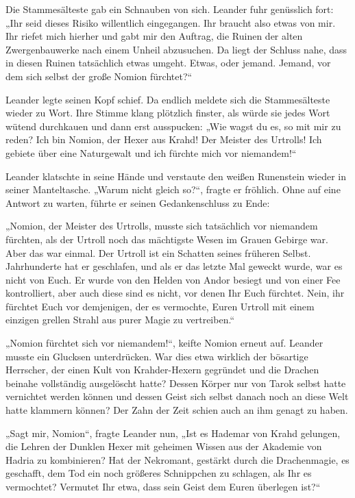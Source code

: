 Die Stammesälteste gab ein Schnauben von sich. Leander fuhr genüsslich fort: „Ihr seid dieses Risiko willentlich eingegangen. Ihr braucht also etwas von mir. Ihr riefet mich hierher und gabt mir den Auftrag, die Ruinen der alten Zwergenbauwerke nach einem Unheil abzusuchen. Da liegt der Schluss nahe, dass in diesen Ruinen tatsächlich etwas umgeht. Etwas, oder jemand. Jemand, vor dem sich selbst der große Nomion fürchtet?“

Leander legte seinen Kopf schief. Da endlich meldete sich die Stammesälteste wieder zu Wort. Ihre Stimme klang plötzlich finster, als würde sie jedes Wort wütend durchkauen und dann erst ausspucken: „Wie wagst du es, so mit mir zu reden? Ich bin Nomion, der Hexer aus Krahd! Der Meister des Urtrolls! Ich gebiete über eine Naturgewalt und ich fürchte mich vor niemandem!“

Leander klatschte in seine Hände und verstaute den weißen Runenstein wieder in seiner Manteltasche. „Warum nicht gleich so?“, fragte er fröhlich. Ohne auf eine Antwort zu warten, führte er seinen Gedankenschluss zu Ende:

„Nomion, der Meister des Urtrolls, musste sich tatsächlich vor niemandem fürchten, als der Urtroll noch das mächtigste Wesen im Grauen Gebirge war. Aber das war einmal. Der Urtroll ist ein Schatten seines früheren Selbst. Jahrhunderte hat er geschlafen, und als er das letzte Mal geweckt wurde, war es nicht von Euch. Er wurde von den Helden von Andor besiegt und von einer Fee kontrolliert, aber auch diese sind es nicht, vor denen Ihr Euch fürchtet. Nein, ihr fürchtet Euch vor demjenigen, der es vermochte, Euren Urtroll mit einem einzigen grellen Strahl aus purer Magie zu vertreiben.“

„Nomion fürchtet sich vor niemandem!“, keifte Nomion erneut auf. Leander musste ein Glucksen unterdrücken. War dies etwa wirklich der bösartige Herrscher, der einen Kult von Krahder-Hexern gegründet und die Drachen beinahe vollständig ausgelöscht hatte? Dessen Körper nur von Tarok selbst hatte vernichtet werden können und dessen Geist sich selbst danach noch an diese Welt hatte klammern können? Der Zahn der Zeit schien auch an ihm genagt zu haben.

„Sagt mir, Nomion“, fragte Leander nun, „Ist es Hademar von Krahd gelungen, die Lehren der Dunklen Hexer mit geheimen Wissen aus der Akademie von Hadria zu kombinieren? Hat der Nekromant, gestärkt durch die Drachenmagie, es geschafft, dem Tod ein noch größeres Schnippchen zu schlagen, als Ihr es vermochtet? Vermutet Ihr etwa, dass sein Geist dem Euren überlegen ist?“

